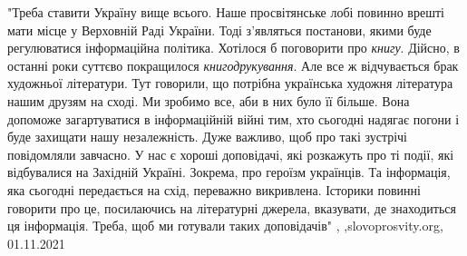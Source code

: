 "Треба ставити Україну вище всього. Наше просвітянське лобі повинно врешті мати
місце у Верховній Раді України. Тоді з’являться постанови, якими буде
регулюватися інформаційна політика.  Хотілося б поговорити про \emph{книгу}. Дійсно, в
останні роки суттєво покращилося \emph{книгодрукування}. Але все ж відчувається брак
художньої літератури. Тут говорили, що потрібна українська художня література
нашим друзям на сході. Ми зробимо все, аби в них було її більше. Вона допоможе
загартуватися в інформаційній війні тим, хто сьогодні надягає погони і буде
захищати нашу незалежність. Дуже важливо, щоб про такі зустрічі повідомляли
завчасно. У нас є хороші доповідачі, які розкажуть про ті події, які
відбувалися на Західній Україні. Зокрема, про героїзм українців. Та інформація,
яка сьогодні передається на схід, переважно викривлена. Історики повинні
говорити про це, посилаючись на літературні джерела, вказувати, де знаходиться
ця інформація. Треба, щоб ми готували таких доповідачів"
, ,slovoprosvity.org, 01.11.2021
